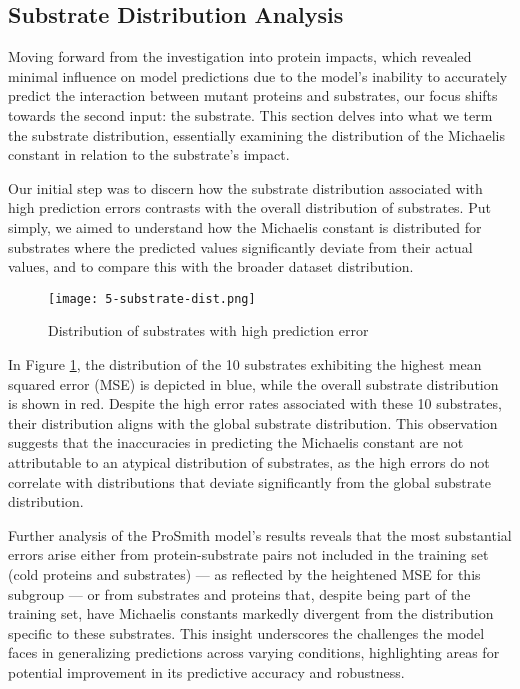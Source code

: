 \subsection{Substrate Distribution Analysis}

Moving forward from the investigation into protein impacts, which revealed minimal influence on model predictions due to the model's inability to accurately predict the interaction between mutant proteins and substrates, our focus shifts towards the second input: the substrate. This section delves into what we term the substrate distribution, essentially examining the distribution of the Michaelis constant in relation to the substrate's impact.

Our initial step was to discern how the substrate distribution associated with high prediction errors contrasts with the overall distribution of substrates. Put simply, we aimed to understand how the Michaelis constant is distributed for substrates where the predicted values significantly deviate from their actual values, and to compare this with the broader dataset distribution.

\begin{figure}
    \centering
    \texttt{[image: 5-substrate-dist.png]}
    \caption{Distribution of substrates with high prediction error}
    \label{fig:substratedist}
\end{figure}

In Figure \ref{fig:substratedist}, the distribution of the 10 substrates exhibiting the highest mean squared error (MSE) is depicted in blue, while the overall substrate distribution is shown in red. Despite the high error rates associated with these 10 substrates, their distribution aligns with the global substrate distribution. This observation suggests that the inaccuracies in predicting the Michaelis constant are not attributable to an atypical distribution of substrates, as the high errors do not correlate with distributions that deviate significantly from the global substrate distribution.

Further analysis of the ProSmith model's results reveals that the most substantial errors arise either from protein-substrate pairs not included in the training set (cold proteins and substrates) — as reflected by the heightened MSE for this subgroup — or from substrates and proteins that, despite being part of the training set, have Michaelis constants markedly divergent from the distribution specific to these substrates. This insight underscores the challenges the model faces in generalizing predictions across varying conditions, highlighting areas for potential improvement in its predictive accuracy and robustness.

